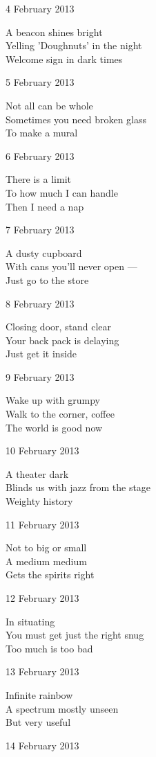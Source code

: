 \documentclass[12pt]{article}
\begin{document}
4 February 2013

A beacon shines bright \\
Yelling 'Doughnuts' in the night \\
Welcome sign in dark times

5 February 2013

Not all can be whole \\
Sometimes you need broken glass \\
To make a mural

6 February 2013

There is a limit \\
To how much I can handle \\
Then I need a nap

7 February 2013

A dusty cupboard \\
With cans you'll never open --- \\
Just go to the store

\newpage

8 February 2013

Closing door, stand clear \\
Your back pack is delaying \\
Just get it inside

9 February 2013

Wake up with grumpy \\
Walk to the corner, coffee \\
The world is good now

10 February 2013

A theater dark \\
Blinds us with jazz from the stage \\
Weighty history

11 February 2013

Not to big or small \\
A medium medium \\
Gets the spirits right

12 February 2013

In situating \\
You must get just the right snug \\
Too much is too bad

13 February 2013

Infinite rainbow \\
A spectrum mostly unseen \\
But very useful

14 February 2013
\end{document}
